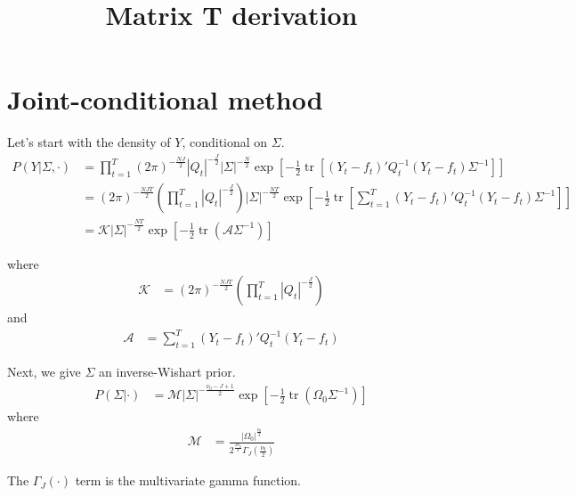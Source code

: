 \documentclass[letter,10pt]{article}
\title{Matrix T derivation}
\DeclareMathOperator\tr{tr}
\newcommand{\K}{\mathcal{K}}
\newcommand{\A}{\mathcal{A}}
\newcommand{\M}{\mathcal{M}}
\begin{document}
\maketitle


\section{Joint-conditional method}


Let's start with the density of $Y$, conditional on $\Sigma$.
\begin{align}
  \label{eq:py}
  P(Y|\Sigma,\cdot)&=\prod_{t=1}^T\left( 2\pi\right)^{-\frac{NJ}{2}}|Q_t|^{-\frac{J}{2}}|\Sigma|^{-\frac{N}{2}}\exp\left[-\frac{1}{2}\tr\left[\left(Y_t-f_t\right)
        'Q_t^{-1}\left(Y_t-f_t\right)\Sigma^{-1}\right]\right]\\
&=\left(2\pi\right)^{-\frac{NJT}{2}}\left(\prod_{t=1}^T|Q_t|^{-\frac{J}{2}}\right)|\Sigma|^{-\frac{NT}{2}}\exp\left[-\frac{1}{2}\tr\left[\sum_{t=1}^T\left(Y_t-f_t\right)'Q_t^{-1}\left(Y_t-f_t\right)\Sigma^{-1}\right]\right]\\
&=\K|\Sigma|^{-\frac{NT}{2}}\exp\left[-\frac{1}{2}\tr\left(\A\Sigma^{-1}\right)\right]
\end{align}

where
\begin{align}
  \label{eq:2}
  \K&=\left(2\pi\right)^{-\frac{NJT}{2}}\left(\prod_{t=1}^T|Q_t|^{-\frac{J}{2}}\right)
\end{align}
and
\begin{align}
  \label{eq:defA}
  \A&=\sum_{t=1}^T\left(Y_t-f_t\right)'Q_t^{-1}\left(Y_t-f_t\right)
\end{align}


Next, we give $\Sigma$ an inverse-Wishart prior.
\begin{align}
  \label{eq:pSig}
  P\left(\Sigma|\cdot\right)&=\M|\Sigma|^{-\frac{\nu_0-J+1}{2}}\exp\left[-\frac{1}{2}\tr\left(\Omega_0\Sigma^{-1}\right)\right]
\end{align}
where
\begin{align}
  \label{eq:defM}
  \M&=\frac{|\Omega_0|^{\frac{\nu_0}{2}}}{2^{\frac{J\nu_0}{2}}\Gamma_J\left(\frac{\nu_0}{2}\right)}
\end{align}


The $\Gamma_J(\cdot)$ term is the multivariate gamma function.
\end{document}
